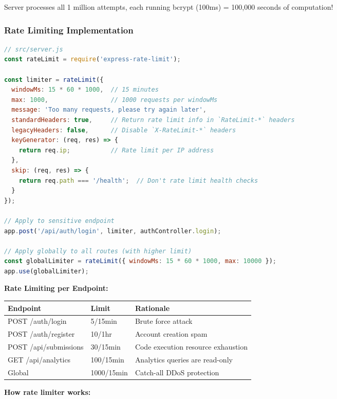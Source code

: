 \documentclass[12pt,a4paper,oneside]{article}
\begin{document}
Server processes all 1 million attempts, each running bcrypt (100ms) = 100,000 seconds of computation!

\subsubsection{Rate Limiting Implementation}

\begin{lstlisting}[language=JavaScript, caption=Express Rate Limiter]
// src/server.js
const rateLimit = require('express-rate-limit');

const limiter = rateLimit({
  windowMs: 15 * 60 * 1000,  // 15 minutes
  max: 1000,                 // 1000 requests per windowMs
  message: 'Too many requests, please try again later',
  standardHeaders: true,     // Return rate limit info in `RateLimit-*` headers
  legacyHeaders: false,      // Disable `X-RateLimit-*` headers
  keyGenerator: (req, res) => {
    return req.ip;           // Rate limit per IP address
  },
  skip: (req, res) => {
    return req.path === '/health';  // Don't rate limit health checks
  }
});

// Apply to sensitive endpoint
app.post('/api/auth/login', limiter, authController.login);

// Apply globally to all routes (with higher limit)
const globalLimiter = rateLimit({ windowMs: 15 * 60 * 1000, max: 10000 });
app.use(globalLimiter);
\end{lstlisting}

\textbf{Rate Limiting per Endpoint:}

\begin{table}[H]
\centering
\begin{tabular}{|p{3cm}|p{2cm}|p{7cm}|}
\hline
\textbf{Endpoint} & \textbf{Limit} & \textbf{Rationale} \\
\hline
POST /auth/login & 5/15min & Brute force attack \\
\hline
POST /auth/register & 10/1hr & Account creation spam \\
\hline
POST /api/submissions & 30/15min & Code execution resource exhaustion \\
\hline
GET /api/analytics & 100/15min & Analytics queries are read-only \\
\hline
Global & 1000/15min & Catch-all DDoS protection \\
\hline
\end{tabular}
\end{table}

\textbf{How rate limiter works:}
\end{document}
